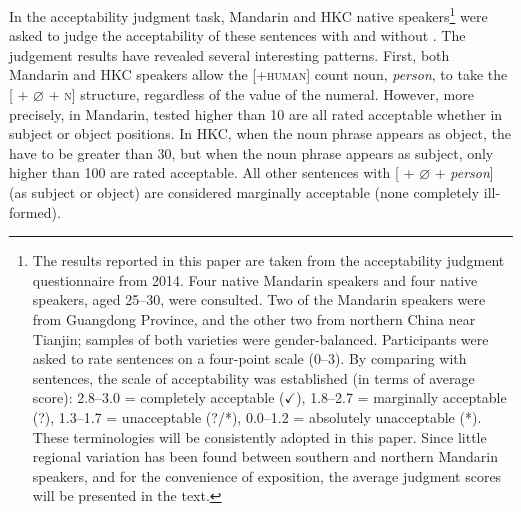 \documentclass[output=paper]{langsci/langscibook}
\begin{document}
In the acceptability judgment task, Mandarin and \gls{HKC} native
speakers\footnote{The results reported in this paper are taken from the
    acceptability judgment questionnaire from 2014. Four native
    Mandarin speakers and four native 
    speakers, aged 25--30,
    were consulted. Two of the Mandarin speakers were from Guangdong
    Province, and the other two from northern China near Tianjin; samples of
    both varieties were gender-balanced. Participants were asked to rate
    sentences on a four-point scale (0--3). By comparing with  sentences,
    the scale of acceptability was established (in terms of average score):
    2.8--3.0 = completely acceptable ($\checkmark$), 1.8--2.7 = marginally acceptable (?),
    1.3--1.7 = unacceptable (?/*), 0.0--1.2 = absolutely unacceptable (*). These
    terminologies will be consistently adopted in this paper. Since little
    regional variation has been found between southern and northern Mandarin
speakers, and for the convenience of exposition, the average judgment scores
will be presented in the text.} were asked to judge the acceptability of these
sentences with and without . The judgement results have revealed
several interesting patterns.  First, both Mandarin and \gls{HKC} speakers
allow the [+\textsc{human}] count noun, \emph{person}, to take the [\Num{} +
$\varnothing$ + \textsc{n}] structure, regardless of the value of the numeral. However,
more precisely, in Mandarin, tested  higher than 10 are all rated
acceptable whether in subject or object positions.  In \gls{HKC}, when the noun
phrase appears as object, the  have to be greater than 30, but when the
noun phrase appears as subject, only  higher than 100 are rated
acceptable. All other sentences with [\Num{} + ${\varnothing}$ + \emph{person}]
(as subject or object) are considered marginally acceptable (none completely
ill-formed).
\end{document}
